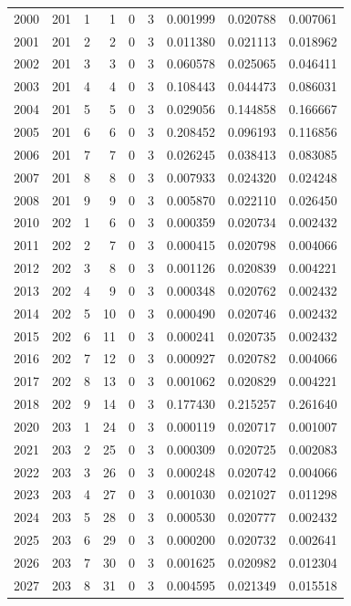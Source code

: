 \begin{longtable}{rrrrrrrrr}
2000 & 201 & 1 & 1 & 0 & 3 & 0.001999 & 0.020788 & 0.007061 \\
2001 & 201 & 2 & 2 & 0 & 3 & 0.011380 & 0.021113 & 0.018962 \\
2002 & 201 & 3 & 3 & 0 & 3 & 0.060578 & 0.025065 & 0.046411 \\
2003 & 201 & 4 & 4 & 0 & 3 & 0.108443 & 0.044473 & 0.086031 \\
2004 & 201 & 5 & 5 & 0 & 3 & 0.029056 & 0.144858 & 0.166667 \\
2005 & 201 & 6 & 6 & 0 & 3 & 0.208452 & 0.096193 & 0.116856 \\
2006 & 201 & 7 & 7 & 0 & 3 & 0.026245 & 0.038413 & 0.083085 \\
2007 & 201 & 8 & 8 & 0 & 3 & 0.007933 & 0.024320 & 0.024248 \\
2008 & 201 & 9 & 9 & 0 & 3 & 0.005870 & 0.022110 & 0.026450 \\
2010 & 202 & 1 & 6 & 0 & 3 & 0.000359 & 0.020734 & 0.002432 \\
2011 & 202 & 2 & 7 & 0 & 3 & 0.000415 & 0.020798 & 0.004066 \\
2012 & 202 & 3 & 8 & 0 & 3 & 0.001126 & 0.020839 & 0.004221 \\
2013 & 202 & 4 & 9 & 0 & 3 & 0.000348 & 0.020762 & 0.002432 \\
2014 & 202 & 5 & 10 & 0 & 3 & 0.000490 & 0.020746 & 0.002432 \\
2015 & 202 & 6 & 11 & 0 & 3 & 0.000241 & 0.020735 & 0.002432 \\
2016 & 202 & 7 & 12 & 0 & 3 & 0.000927 & 0.020782 & 0.004066 \\
2017 & 202 & 8 & 13 & 0 & 3 & 0.001062 & 0.020829 & 0.004221 \\
2018 & 202 & 9 & 14 & 0 & 3 & 0.177430 & 0.215257 & 0.261640 \\
2020 & 203 & 1 & 24 & 0 & 3 & 0.000119 & 0.020717 & 0.001007 \\
2021 & 203 & 2 & 25 & 0 & 3 & 0.000309 & 0.020725 & 0.002083 \\
2022 & 203 & 3 & 26 & 0 & 3 & 0.000248 & 0.020742 & 0.004066 \\
2023 & 203 & 4 & 27 & 0 & 3 & 0.001030 & 0.021027 & 0.011298 \\
2024 & 203 & 5 & 28 & 0 & 3 & 0.000530 & 0.020777 & 0.002432 \\
2025 & 203 & 6 & 29 & 0 & 3 & 0.000200 & 0.020732 & 0.002641 \\
2026 & 203 & 7 & 30 & 0 & 3 & 0.001625 & 0.020982 & 0.012304 \\
2027 & 203 & 8 & 31 & 0 & 3 & 0.004595 & 0.021349 & 0.015518 \\

\end{longtable}
